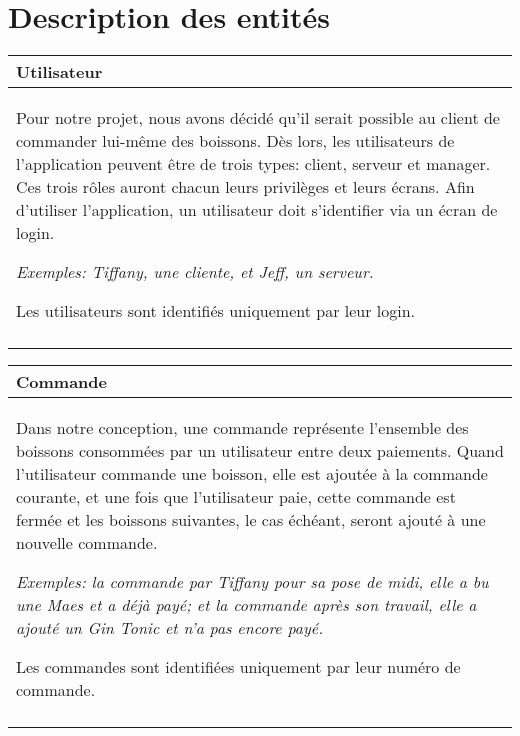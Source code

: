 \documentclass[a4paper,10pt]{article}
\begin{document}

\section{Description des entités}

\begin{tabu}{X}
\textbf{Utilisateur} \\
\toprule
Pour notre projet, nous avons décidé qu'il serait possible au client de commander lui-même des boissons. Dès lors, les utilisateurs de l'application peuvent être de trois types: client, serveur et manager. Ces trois rôles auront chacun leurs privilèges et leurs écrans. Afin d'utiliser l'application, un utilisateur doit s'identifier via un écran de login.

\textsl{Exemples: Tiffany, une cliente, et Jeff, un serveur.}

Les utilisateurs sont identifiés uniquement par leur login. \\\\
\end{tabu}

\begin{tabu}{X}
\textbf{Commande} \\
\toprule

Dans notre conception, une commande représente l'ensemble des boissons consommées par un utilisateur entre deux paiements. Quand l'utilisateur commande une boisson, elle est ajoutée à la commande courante, et une fois que l'utilisateur paie, cette commande est fermée et les boissons suivantes, le cas échéant, seront ajouté à une nouvelle commande.

\textsl{Exemples: la commande  par Tiffany pour sa pose de midi, elle a bu une Maes et a déjà payé; et la commande  après son travail, elle a ajouté un Gin Tonic et n'a pas encore payé.}

Les commandes sont identifiées uniquement par leur numéro de commande. \\\\
\end{tabu}
\end{document}
